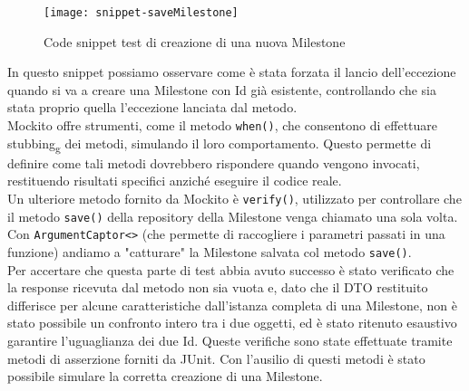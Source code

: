 \begin{figure}[H] 
    \centering 
    \texttt{[image: snippet-saveMilestone]} 
    \caption{Code snippet test di creazione di una nuova Milestone}
\end{figure}

\noindent In questo snippet possiamo osservare come è stata forzata il lancio dell’eccezione quando si va a creare una Milestone con Id già esistente, controllando che sia stata proprio quella l’eccezione lanciata dal metodo.\\
Mockito offre strumenti, come il metodo \texttt{when()}, che consentono di effettuare stubbing\textsubscript{g} dei metodi, simulando il loro comportamento. Questo permette di definire come tali metodi dovrebbero rispondere quando vengono invocati, restituendo risultati specifici anziché eseguire il codice reale.\\ 
Un ulteriore metodo fornito da Mockito è \texttt{verify()}, utilizzato per controllare che il metodo \texttt{save()} della repository della Milestone venga chiamato una sola volta. Con \texttt{ArgumentCaptor<>} (che permette di raccogliere i parametri passati in una funzione) andiamo a "catturare" la Milestone salvata col metodo \texttt{save()}.\\
Per accertare che questa parte di test abbia avuto successo è stato verificato che la response ricevuta dal metodo non sia vuota e, dato che il DTO restituito differisce per alcune caratteristiche dall’istanza completa di una Milestone, non è stato possibile un confronto intero tra i due oggetti, ed è stato ritenuto esaustivo garantire l’uguaglianza dei due Id. Queste verifiche sono state effettuate tramite metodi di asserzione forniti da JUnit.
Con l’ausilio di questi metodi è stato possibile simulare la corretta creazione di una Milestone.\\

